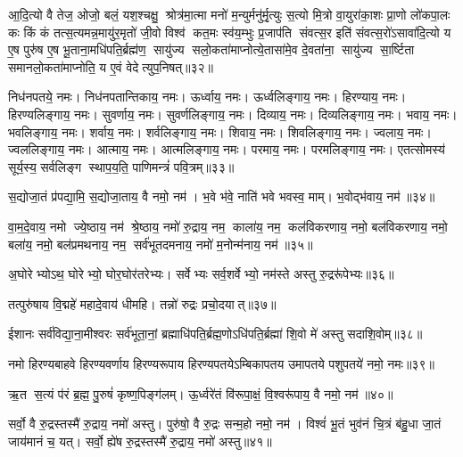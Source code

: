 आ॒दि॒त्यो वै तेज॒ ओजो॒ बलं॒ यश॒श्चक्षु॒ श्रोत्र॑मा॒त्मा मनो॑ म॒न्युर्मनु॑र्मृ॒त्युः स॒त्यो मि॒त्रो वा॒युरा॑का॒शः प्रा॒णो लो॑कपा॒लः कः किं कं तत्स॒त्यमन्न॒मायु॑र॒मृतो॑ जी॒वो विश्व॑ कत॒मः स्व॑य॒म्भुः प्र॒जाप॑ति संवत्स॒र इति॑ संवत्स॒रो॑ऽसावा॑दि॒त्यो य ए॒ष पुरु॑ष ए॒ष भू॒ताना॒मधि॑पति॒र्ब्रह्म॑ण॒ सायु॑ज्य सलो॒कता॑माप्नोत्ये॒तासा॑मे॒व दे॒वता॑ना॒ सायु॑ज्य सा॒र्ष्टिता समानलो॒कता॑माप्नोति॒ य ए॒वं वेदेत्युप॒निषत्॥३२॥
\anuvakamend

निध॑नपतये॒ नमः। निध॑नपतान्तिकाय॒ नमः। ऊर्ध्वाय॒ नमः। ऊर्ध्वलिङ्गाय॒ नमः। हिरण्याय॒ नमः। हिरण्यलिङ्गाय॒ नमः। सुवर्णाय॒ नमः। सुवर्णलिङ्गाय॒ नमः। दिव्याय॒ नमः। दिव्यलिङ्गाय॒ नमः। भवाय॒ नमः। भवलिङ्गाय॒ नमः। शर्वाय॒ नमः। शर्वलिङ्गाय॒ नमः। शिवाय॒ नमः। शिवलिङ्गाय॒ नमः। ज्वलाय॒ नमः। ज्वललिङ्गाय॒ नमः। आत्माय॒ नमः। आत्मलिङ्गाय॒ नमः। परमाय॒ नमः। परमलिङ्गाय॒ नमः। एतत्सोमस्य॑ सूर्य॒स्य॒ सर्वलिङ्ग स्थाप॒य॒ति॒ पाणिमन्त्रं॑ पवि॒त्रम्॥३३॥
\anuvakamend

स॒द्योजा॒तं प्र॑पद्या॒मि॒ स॒द्योजा॒ताय॒ वै नमो॒ नम॑। भ॒वे भ॑वे॒ नाति॑ भवे भवस्व॒ माम्। भ॒वोद्भ॑वाय॒ नम॑॥३४॥
\anuvakamend

वा॒म॒दे॒वाय॒ नमो ज्ये॒ष्ठाय॒ नम॑ श्रे॒ष्ठाय॒ नमो॑ रु॒द्राय॒ नम॒ काला॑य॒ नम॒ कल॑विकरणाय॒ नमो॒ बल॑विकरणाय॒ नमो॒ बला॑य॒ नमो॒ बल॑प्रमथनाय॒ नम॒ सर्व॑भूतदमनाय॒ नमो॑ म॒नोन्म॑नाय॒ नम॑॥३५॥\anuvakamend

अ॒घोरेभ्योऽथ॒ घोरेभ्यो॒ घोर॒घोर॑तरेभ्यः। सर्वेभ्यः सर्व॒शर्वेभ्यो॒ नम॑स्ते अस्तु रु॒द्ररू॑पेभ्यः॥३६॥
\anuvakamend

तत्पुरु॑षाय वि॒द्महे॑ महादे॒वाय॑ धीमहि। तन्नो॑ रुद्रः प्रचो॒दयात्॥३७॥
\anuvakamend

ईशानः सर्व॑विद्या॒ना॒मीश्वरः सर्व॑भूता॒नां॒ ब्रह्माधि॑पति॒र्ब्रह्म॒णो\-ऽधि॑पति॒र्ब्रह्मा॑ शि॒वो मे॑ अस्तु सदाशि॒वोम्॥३८॥
\anuvakamend

नमो हिरण्यबाहवे हिरण्यवर्णाय हिरण्यरूपाय हिरण्यपतये\-ऽम्बिकापतय उमापतये पशुपतये॑ नमो॒ नमः॥३९॥
\anuvakamend

ऋ॒त स॒त्यं प॑रं ब्र॒ह्म॒ पु॒रुषं॑ कृष्ण॒पिङ्ग॑लम्। ऊ॒र्ध्वरे॑तं वि॑रूपा॒क्षं॒ वि॒श्वरू॑पाय॒ वै नमो॒ नम॑॥४०॥
\anuvakamend

सर्वो॒ वै रु॒द्रस्तस्मै॑ रु॒द्राय॒ नमो॑ अस्तु। पुरु॑षो॒ वै रु॒द्रः सन्म॒हो नमो॒ नम॑। विश्वं॑ भू॒तं भुव॑नं चि॒त्रं ब॑हु॒धा जा॒तं जाय॑मानं च॒ यत्। सर्वो॒ ह्ये॑ष रु॒द्रस्तस्मै॑ रु॒द्राय॒ नमो॑ अस्तु॥४१॥
\anuvakamend


